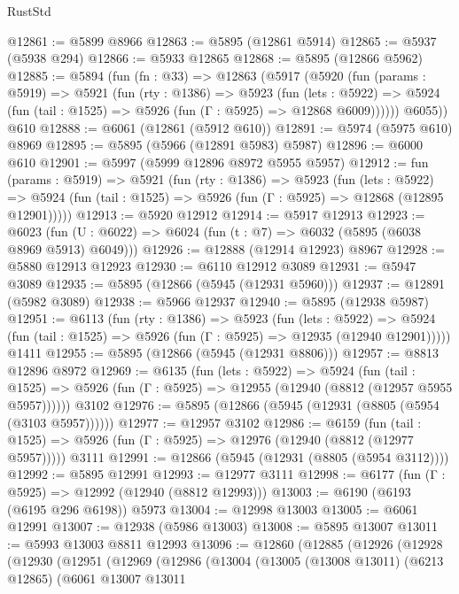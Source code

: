\begin{lexlean}{RustStd}
\begin{coremodule}
{{@12861 := @5899 @8966
@12863 := @5895 (@12861 @5914)
@12865 := @5937 (@5938 @294)
@12866 := @5933 @12865
@12868 := @5895 (@12866 @5962)
@12885 := @5894
    (fun (fn : @33) =>
    @12863
      (@5917
        (@5920
          (fun (params : @5919) =>
          @5921
            (fun (rty : @1386) =>
            @5923
              (fun (lets : @5922) =>
              @5924 (fun (tail : @1525) => @5926 (fun (Γ : @5925) => @12868 @6009))))))
        @6055))
    @610
@12888 := @6061 (@12861 (@5912 @610))
@12891 := @5974 (@5975 @610) @8969
@12895 := @5895 (@5966 (@12891 @5983) @5987)
@12896 := @6000 @610
@12901 := @5997 (@5999 @12896 @8972 @5955 @5957)
@12912 := fun (params : @5919) =>
  @5921
    (fun (rty : @1386) =>
    @5923
      (fun (lets : @5922) =>
      @5924 (fun (tail : @1525) => @5926 (fun (Γ : @5925) => @12868 (@12895 @12901)))))
@12913 := @5920 @12912
@12914 := @5917 @12913
@12923 := @6023 (fun (U : @6022) => @6024 (fun (t : @7) => @6032 (@5895 (@6038 @8969 @5913) @6049)))
@12926 := @12888 (@12914 @12923) @8967
@12928 := @5880 @12913 @12923
@12930 := @6110 @12912 @3089
@12931 := @5947 @3089
@12935 := @5895 (@12866 (@5945 (@12931 @5960)))
@12937 := @12891 (@5982 @3089)
@12938 := @5966 @12937
@12940 := @5895 (@12938 @5987)
@12951 := @6113
    (fun (rty : @1386) =>
    @5923
      (fun (lets : @5922) =>
      @5924 (fun (tail : @1525) => @5926 (fun (Γ : @5925) => @12935 (@12940 @12901)))))
    @1411
@12955 := @5895 (@12866 (@5945 (@12931 @8806)))
@12957 := @8813 @12896 @8972
@12969 := @6135
    (fun (lets : @5922) =>
    @5924
      (fun (tail : @1525) =>
      @5926 (fun (Γ : @5925) => @12955 (@12940 (@8812 (@12957 @5955 @5957))))))
    @3102
@12976 := @5895 (@12866 (@5945 (@12931 (@8805 (@5954 (@3103 @5957))))))
@12977 := @12957 @3102
@12986 := @6159
    (fun (tail : @1525) => @5926 (fun (Γ : @5925) => @12976 (@12940 (@8812 (@12977 @5957)))))
    @3111
@12991 := @12866 (@5945 (@12931 (@8805 (@5954 @3112))))
@12992 := @5895 @12991
@12993 := @12977 @3111
@12998 := @6177 (fun (Γ : @5925) => @12992 (@12940 (@8812 @12993)))
@13003 := @6190 (@6193 (@6195 @296 @6198)) @5973
@13004 := @12998 @13003
@13005 := @6061 @12991
@13007 := @12938 (@5986 @13003)
@13008 := @5895 @13007
@13011 := @5993 @13003 @8811 @12993
@13096 := @12860
    (@12885
      (@12926
        (@12928
          (@12930
            (@12951
              (@12969
                (@12986
                  (@13004
                    (@13005
                      (@13008 @13011)
                      (@6213 @12865)
                      (@6061
                        @13007
                        @13011
}}
\end{coremodule}
\end{lexlean}
